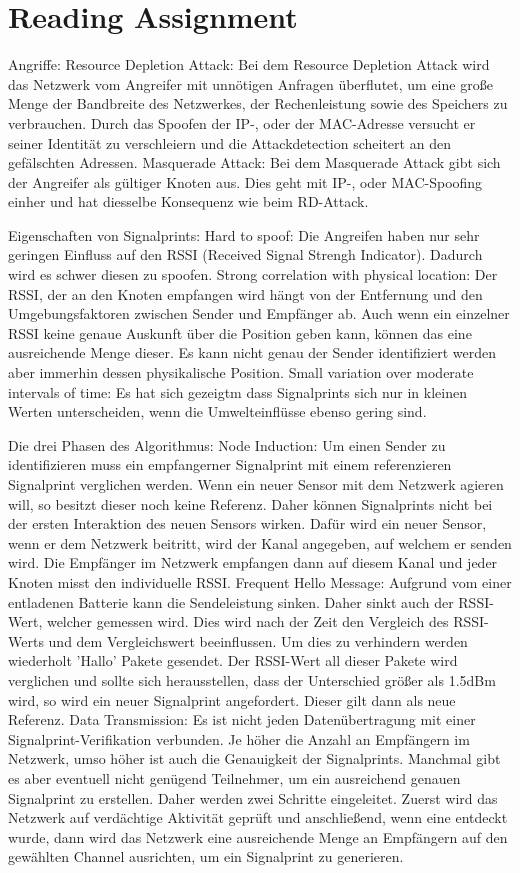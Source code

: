 \documentclass[12pt,a4paper]{article}
\begin{document}
\section{Reading Assignment}
Angriffe:
	Resource Depletion Attack: 
		Bei dem Resource Depletion Attack wird das Netzwerk vom Angreifer mit unnötigen Anfragen überflutet, um eine große Menge der Bandbreite des Netzwerkes, der Rechenleistung sowie des Speichers zu verbrauchen. Durch das Spoofen der IP-, oder der MAC-Adresse versucht er seiner Identität zu verschleiern und die Attackdetection scheitert an den gefälschten Adressen.
	Masquerade Attack:
		Bei dem Masquerade Attack gibt sich der Angreifer als gültiger Knoten aus. Dies geht mit IP-, oder MAC-Spoofing einher und hat diesselbe Konsequenz wie beim RD-Attack.

Eigenschaften von Signalprints:
	Hard to spoof: 
		Die Angreifen haben nur sehr geringen Einfluss auf den RSSI (Received Signal Strengh Indicator). Dadurch wird es schwer diesen zu spoofen. 
	Strong correlation with physical location:
		Der RSSI, der an den Knoten empfangen wird hängt von der Entfernung und den Umgebungsfaktoren zwischen Sender und Empfänger ab. Auch wenn ein einzelner RSSI keine genaue Auskunft über die Position geben kann, können das eine ausreichende Menge dieser. Es kann nicht genau der Sender identifiziert werden aber immerhin dessen physikalische Position.
	Small variation over moderate intervals of time:
		Es hat sich gezeigtm dass Signalprints sich nur in kleinen Werten unterscheiden, wenn die Umwelteinflüsse ebenso gering sind.

Die drei Phasen des Algorithmus:
	Node Induction: 
		Um einen Sender zu identifizieren muss ein empfangerner Signalprint mit einem referenzieren Signalprint verglichen werden. Wenn ein neuer Sensor mit dem Netzwerk agieren will, so besitzt dieser noch keine Referenz.  Daher können Signalprints nicht bei der ersten Interaktion des neuen Sensors wirken. Dafür wird ein neuer Sensor, wenn er dem Netzwerk beitritt, wird der Kanal angegeben, auf welchem er senden wird. Die Empfänger im Netzwerk empfangen dann auf diesem Kanal und jeder Knoten misst den individuelle RSSI. 
	Frequent Hello Message:
		Aufgrund vom einer entladenen Batterie kann die Sendeleistung sinken. Daher sinkt auch der RSSI-Wert, welcher gemessen wird. Dies wird nach der Zeit den Vergleich des RSSI-Werts und dem Vergleichswert beeinflussen. Um dies zu verhindern werden wiederholt 'Hallo' Pakete gesendet. Der RSSI-Wert all dieser Pakete wird verglichen und sollte sich herausstellen, dass der Unterschied größer als 1.5dBm wird, so wird ein neuer Signalprint angefordert. Dieser gilt dann als neue Referenz.
	Data Transmission:
		Es ist nicht jeden Datenübertragung mit einer Signalprint-Verifikation verbunden. Je höher die Anzahl an Empfängern im Netzwerk, umso höher ist auch die Genauigkeit der Signalprints. Manchmal gibt es aber eventuell nicht genügend Teilnehmer, um ein ausreichend genauen Signalprint zu erstellen. Daher werden zwei Schritte eingeleitet. Zuerst wird das Netzwerk auf verdächtige Aktivität geprüft und anschließend, wenn eine entdeckt wurde, dann wird das Netzwerk eine ausreichende Menge an Empfängern auf den gewählten Channel ausrichten, um ein Signalprint zu generieren.
\end{document}
